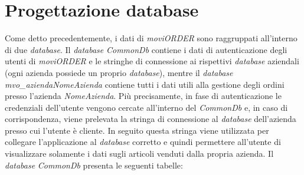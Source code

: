 \section{Progettazione database} \label{progdb}

Come detto precedentemente, i dati di \textit{moviORDER} sono raggruppati all'interno di due \textit{database}. Il \textit{database} \textit{CommonDb} contiene i dati di autenticazione degli utenti di \textit{moviORDER} e le stringhe di connessione ai rispettivi \textit{database} aziendali (ogni azienda possiede un proprio \textit{database}), mentre il \textit{database} \textit{mvo\_aziendaNomeAzienda} contiene tutti i dati utili alla gestione degli ordini presso l'azienda \textit{NomeAzienda}. Più precisamente, in fase di autenticazione le credenziali dell'utente vengono cercate all'interno del \textit{CommonDb} e, in caso di corrispondenza, viene prelevata la stringa di connessione al \textit{database} dell'azienda presso cui l'utente è cliente. In seguito questa stringa viene utilizzata per collegare l'applicazione al \textit{database} corretto e quindi permettere all'utente di visualizzare solamente i dati sugli articoli venduti dalla propria azienda.
Il \textit{database} \textit{CommonDb} presenta le seguenti tabelle:
